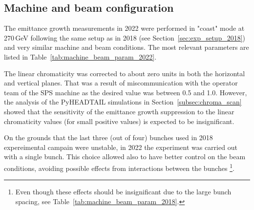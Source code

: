 \subsection{Machine and beam configuration}\label{sec:cc_md_2022_parameters}
The emittance growth measurements in 2022 were performed in "coast" mode at 270\,GeV following the same setup as in 2018 (see Section~\ref{sec:exp_setup_2018}) and very similar machine and beam conditions. The most relevant parameters are listed in Table~\ref{tab:machine_beam_param_2022}. 

The linear chromaticity was corrected to about zero units in both the horizontal and vertical planes. That was a result of miscommunication with the operator team of the SPS machine as the desired value was between 0.5 and 1.0. However, the analysis of the PyHEADTAIL simulations in Section~\ref{subsec:chroma_scan} showed that the sensitivity of the emittance growth suppression to the linear chromaticity values (for small positive values) is expected to be insignificant. 

On the grounds that the last three (out of four) bunches used in 2018 expereimental campain were unstable, in 2022 the experiment was carried out with a single bunch. This choice allowed also to have better control on the beam conditions, avoiding possible effects from interactions between the bunches \footnote{Even though these effects should be insignificant due to the large bunch spacing, see Table~\ref{tab:machine_beam_param_2018}.}.

